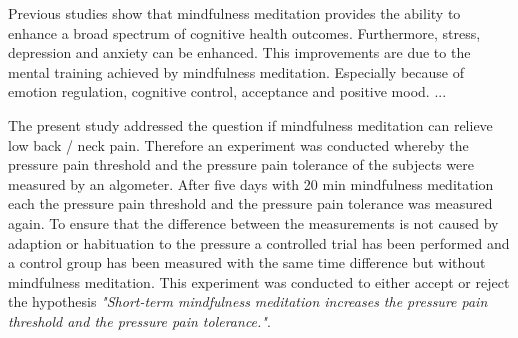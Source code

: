 Previous studies show that mindfulness meditation provides the ability to enhance a broad spectrum of cognitive health outcomes. Furthermore, stress, depression and anxiety can be enhanced. This improvements are due to the mental training achieved by mindfulness meditation. Especially because of emotion regulation, cognitive control, acceptance and positive mood. \cite{Zeidan2012;Zeidan2016} ...

The present study addressed the question if mindfulness meditation can relieve low back / neck pain. Therefore an experiment was conducted whereby the pressure pain threshold and the pressure pain tolerance of the subjects were measured by an algometer. After five days with 20 min mindfulness meditation each the pressure pain threshold and the pressure pain tolerance was measured again. To ensure that the difference between the measurements is not caused by adaption or habituation to the pressure a controlled trial has been performed and a control group has been measured with the same time difference but without mindfulness meditation.
This experiment was conducted to either accept or reject the hypothesis \textit{"Short-term mindfulness meditation increases the pressure pain threshold and the pressure pain tolerance."}.